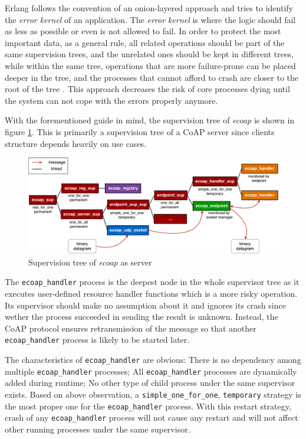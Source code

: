 Erlang follows the convention of an onion-layered approach and tries to identify the \textit{error kernel} of an application. The \textit{error kernel} is where the logic should fail as less as possible or even is not allowed to fail. In order to protect the most important data, as a general rule, all related operations should be part of the same supervision trees, and the unrelated ones should be kept in different trees, while within the same tree, operations that are more failure-prone can be placed deeper in the tree, and the processes that cannot afford to crash are closer to the root of the tree \cite{learn_you_some_erlang}. This approach decreases the risk of core processes dying until the system can not cope with the errors properly anymore.

With the forementioned guide in mind, the supervision tree of \textit{ecoap} is shown in figure \ref{fig:system_arch}. This is primarily a supervision tree of a CoAP server since clients structure depends heavily on use cases. 

\begin{figure}[!htbp]
\centering
\includegraphics[scale = 0.46]{system_arch}
\caption{Supervision tree of \textit{ecoap} as server}
\label{fig:system_arch}
\end{figure}

The \verb|ecoap_handler| process is the deepest node in the whole supervisor tree as it executes user-defined resource handler functions which is a more risky operation. Its supervisor should make no assumption about it and ignores its crash since wether the process succeeded in sending the result is unknown. Instead, the CoAP protocol ensures retransmission of the message so that another \verb|ecoap_handler| process is likely to be started later. 

The characteristics of \verb|ecoap_handler| are obvious: There is no dependency among multiple \verb|ecoap_handler| processes; All \verb|ecoap_handler| processes are dynamically added during runtime; No other type of child process under the same supervisor exists. Based on above observation, a \verb|simple_one_for_one|, \verb|temporary| strategy is the most proper one for the \verb|ecoap_handler| process. With this restart strategy, crash of any \verb|ecoap_handler| process will not cause any restart and will not affect other running processes under the same supervisor.

